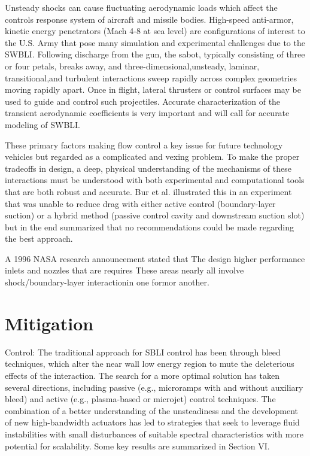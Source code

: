 Unsteady shocks can cause fluctuating aerodynamic loads which affect the controls response system of aircraft and missile bodies. High-speed anti-armor, kinetic energy penetrators (Mach 4-8 at sea level) are configurations of interest to the U.S. Army that pose many simulation and experimental challenges due to the SWBLI. Following discharge from the gun, the sabot, typically consisting of three or four petals, breaks away, and three-dimensional,unsteady, laminar, transitional,and turbulent interactions sweep rapidly across complex geometries moving rapidly apart. Once in flight, lateral thrusters or control surfaces may be used to guide and control such projectiles. Accurate characterization of the transient aerodynamic coefficients is very important and will call for accurate modeling of SWBLI.

These primary factors making flow control a key issue for future technology vehicles but regarded as a complicated and vexing problem. To make the proper tradeoffs in design, a deep, physical understanding of the mechanisms of these interactions must be understood with both experimental and computational tools that are both robust and accurate. Bur et al. illustrated this in an experiment that was unable to reduce drag with either active control (boundary-layer suction) or a hybrid method (passive control cavity and downstream suction slot) but in the end summarized that no recommendations could be made regarding the best approach.

A 1996 NASA research announcement stated that  The design higher performance inlets and nozzles that are  requires  These areas nearly all involve shock/boundary-layer interactionin one formor another. 

\section{Mitigation}

Control: The traditional approach for SBLI control has been through bleed techniques, which alter the near wall low energy region to mute the deleterious effects of the interaction. The search for a more optimal solution has taken several directions, including passive (e.g., microramps with and without auxiliary bleed) and active (e.g., plasma-based or microjet) control techniques. The combination of a better understanding of the unsteadiness and the development of new high-bandwidth actuators has led to strategies that seek to leverage fluid instabilities with small disturbances of suitable spectral characteristics with more potential for scalability. Some key results are summarized in Section VI.


